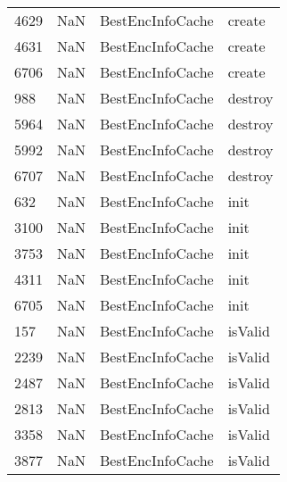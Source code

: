 \begin{tabular}{llll}
4629 &                   NaN &           BestEncInfoCache &                                    create \\
4631 &                   NaN &           BestEncInfoCache &                                    create \\
6706 &                   NaN &           BestEncInfoCache &                                    create \\
988  &                   NaN &           BestEncInfoCache &                                   destroy \\
5964 &                   NaN &           BestEncInfoCache &                                   destroy \\
5992 &                   NaN &           BestEncInfoCache &                                   destroy \\
6707 &                   NaN &           BestEncInfoCache &                                   destroy \\
632  &                   NaN &           BestEncInfoCache &                                      init \\
3100 &                   NaN &           BestEncInfoCache &                                      init \\
3753 &                   NaN &           BestEncInfoCache &                                      init \\
4311 &                   NaN &           BestEncInfoCache &                                      init \\
6705 &                   NaN &           BestEncInfoCache &                                      init \\
157  &                   NaN &           BestEncInfoCache &                                   isValid \\
2239 &                   NaN &           BestEncInfoCache &                                   isValid \\
2487 &                   NaN &           BestEncInfoCache &                                   isValid \\
2813 &                   NaN &           BestEncInfoCache &                                   isValid \\
3358 &                   NaN &           BestEncInfoCache &                                   isValid \\
3877 &                   NaN &           BestEncInfoCache &                                   isValid \\

\end{tabular}
